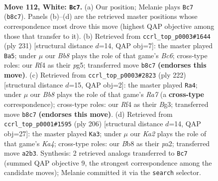 \documentclass[11pt]{article}
\begin{document}
\clearpage

\begin{figure}[p]\centering
\begin{subfigure}{0.46\textwidth}\centering
\resizebox{\linewidth}{!}{%
\newchessgame
\chessboard[
  setfen={1B2r2k/8/8/7P/5R2/8/K4p2/8 w - - 2 112},
  showmover=false,
  pgfstyle=straightmove, color=movearrow, markmove={b8-c7}
]}
\caption{}
\end{subfigure}\hfill
\begin{subfigure}{0.46\textwidth}\centering
\resizebox{\linewidth}{!}{%
\newchessgame
\chessboard[
  setfen={8/3k1p2/8/6P1/4K3/1Rb5/8/8 b - - 86 116},
  showmover=false,
  pgfstyle=straightmove, color=movearrow, markmove={c3-a5}
]}
\caption{}
\end{subfigure}
\\[4pt]
\begin{subfigure}{0.46\textwidth}\centering
\resizebox{\linewidth}{!}{%
\newchessgame
\chessboard[
  setfen={2r2k2/R7/4p3/8/8/3K2B1/8/8 w - - 19 112},
  showmover=false,
  pgfstyle=straightmove, color=movearrow, markmove={a7-a4}
]}
\caption{}
\end{subfigure}\hfill
\begin{subfigure}{0.46\textwidth}\centering
\resizebox{\linewidth}{!}{%
\newchessgame
\chessboard[
  setfen={8/8/1r1P4/8/K2k4/8/p7/R7 w - - 13 104},
  showmover=false,
  pgfstyle=straightmove, color=movearrow, markmove={a4-a3}
]}
\caption{}
\end{subfigure}
\caption{\textbf{Move 112, White: \texttt{Bc7}.} (a) Our position; Melanie plays \texttt{Bc7} (\texttt{b8c7}). Panels (b)--(d) are the retrieved master positions whose correspondence most drove this move (highest QAP objective among those that transfer to it). (b) Retrieved from \texttt{ccrl\_top\_p0003\#1644} (ply 231) [structural distance $d$=14, QAP obj=7]: the master played \texttt{Ba5}; under $\mu$ our \emph{Bb8} plays the role of that game's \emph{Bc6}; cross-type roles: our \emph{R}f4 as their \emph{p}g5; transferred move \texttt{b8c7} \textbf{(endorses this move)}. (c) Retrieved from \texttt{ccrl\_top\_p0003\#2823} (ply 222) [structural distance $d$=15, QAP obj=2]: the master played \texttt{Ra4}; under $\mu$ our \emph{Bb8} plays the role of that game's \emph{Ra7} (a \textbf{cross-type} correspondence); cross-type roles: our \emph{R}f4 as their \emph{B}g3; transferred move \texttt{b8c7} \textbf{(endorses this move)}. (d) Retrieved from \texttt{ccrl\_top\_p0001\#1595} (ply 206) [structural distance $d$=14, QAP obj=27]: the master played \texttt{Ka3}; under $\mu$ our \emph{Ka2} plays the role of that game's \emph{Ka4}; cross-type roles: our \emph{B}b8 as their \emph{p}a2; transferred move \texttt{a2b3}. Synthesis: 2 retrieved analogs transferred to \texttt{Bc7} (summed QAP objective 9, the strongest correspondence among the candidate moves); Melanie committed it via the \texttt{search} selector.}
\label{fig:thought-m222}
\end{figure}
\end{document}
